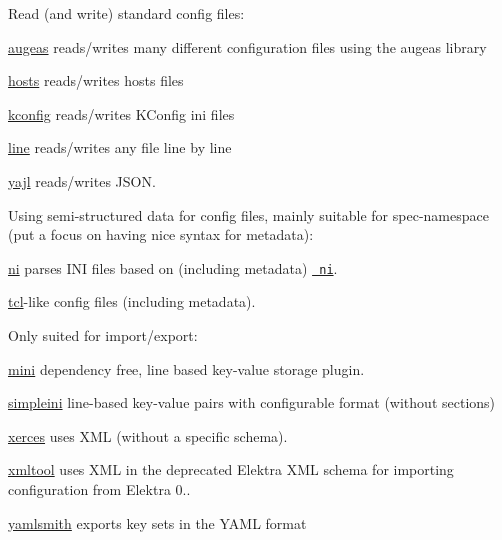 Read (and write) standard config files\+:


\begin{DoxyItemize}
\item \mbox{\hyperlink{autotoc_md44_src_plugins_augeas_README_md}{augeas}} reads/writes many different configuration files using the augeas library
\item \mbox{\hyperlink{autotoc_md268_src_plugins_hosts_README_md}{hosts}} reads/writes hosts files
\item \mbox{\hyperlink{autotoc_md353_src_plugins_kconfig_README_md}{kconfig}} reads/writes K\+Config ini files
\item \mbox{\hyperlink{autotoc_md372_src_plugins_line_README_md}{line}} reads/writes any file line by line
\item \mbox{\hyperlink{autotoc_md726_src_plugins_yajl_README_md}{yajl}} reads/writes J\+S\+ON.
\end{DoxyItemize}

Using semi-\/structured data for config files, mainly suitable for spec-\/namespace (put a focus on having nice syntax for metadata)\+:


\begin{DoxyItemize}
\item \mbox{\hyperlink{autotoc_md500_src_plugins_ni_README_md}{ni}} parses I\+NI files based on (including metadata) \href{https://lab.burn.capital/chaz-attic/bohr/tree/master/include/bohr/ni.h}{\texttt{ ni}}.
\item \mbox{\hyperlink{autotoc_md666_src_plugins_tcl_README_md}{tcl}}-\/like config files (including metadata).
\end{DoxyItemize}

Only suited for import/export\+:


\begin{DoxyItemize}
\item \mbox{\hyperlink{autotoc_md402_src_plugins_mini_README_md}{mini}} dependency free, line based key-\/value storage plugin.
\item \mbox{\hyperlink{autotoc_md638_src_plugins_simpleini_README_md}{simpleini}} line-\/based key-\/value pairs with configurable format (without sections)
\item \mbox{\hyperlink{autotoc_md716_src_plugins_xerces_README_md}{xerces}} uses X\+ML (without a specific schema).
\item \mbox{\hyperlink{autotoc_md722_src_plugins_xmltool_README_md}{xmltool}} uses X\+ML in the deprecated Elektra X\+ML schema for importing configuration from Elektra 0..
\item \mbox{\hyperlink{autotoc_md853_src_plugins_yamlsmith_README_md}{yamlsmith}} exports key sets in the Y\+A\+ML format
\end{DoxyItemize}

